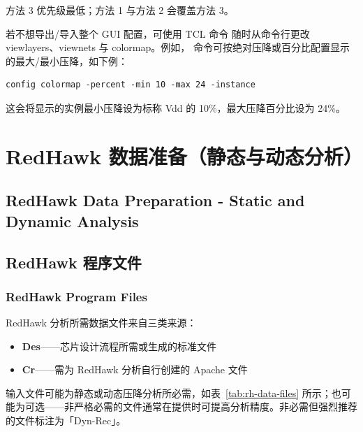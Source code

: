 \begin{noteBox}
方法 3 优先级最低；方法 1 与方法 2 会覆盖方法 3。
\end{noteBox}

若不想导出/导入整个 GUI 配置，可使用 TCL 命令  随时从命令行更改 viewlayers、viewnets 与 colormap。例如， 命令可按绝对压降或百分比配置显示的最大/最小压降，如下例：
\begin{lstlisting}
config colormap -percent -min 10 -max 24 -instance
\end{lstlisting}
这会将显示的实例最小压降设为标称 Vdd 的 10\%，最大压降百分比设为 24\%。

\section{RedHawk 数据准备（静态与动态分析）}
\subsection*{RedHawk Data Preparation - Static and Dynamic Analysis}

\subsection{RedHawk 程序文件}
\subsubsection*{RedHawk Program Files}

RedHawk 分析所需数据文件来自三类来源：
\begin{itemize}
  \item \textbf{Des}——芯片设计流程所需或生成的标准文件
  \item \textbf{Cr}——需为 RedHawk 分析自行创建的 Apache 文件
\end{itemize}

输入文件可能为静态或动态压降分析所必需，如表~\ref{tab:rh-data-files} 所示；也可能为可选——非严格必需的文件通常在提供时可提高分析精度。非必需但强烈推荐的文件标注为「Dyn-Rec」。

